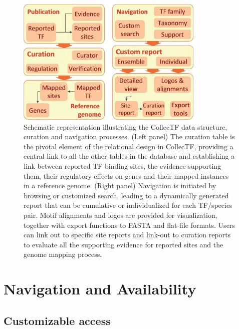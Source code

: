 \begin{figure}
  \centering
  \includegraphics[width=0.8\textwidth]{figures/chapter2/data-structure}
  \caption[Schematic representation illustrating the CollecTF data structure,
  curation and navigation processes.]{Schematic representation illustrating the
    CollecTF data structure, curation and navigation processes. (Left panel)
    The curation table is the pivotal element of the relational design in
    CollecTF, providing a central link to all the other tables in the database
    and establishing a link between reported TF-binding sites, the evidence
    supporting them, their regulatory effects on genes and their mapped
    instances in a reference genome. (Right panel) Navigation is initiated by
    browsing or customized search, leading to a dynamically generated report
    that can be cumulative or individualized for each TF/species pair. Motif
    alignments and logos are provided for visualization, together with export
    functions to FASTA and flat-file formats. Users can link out to specific
    site reports and link-out to curation reports to evaluate all the
    supporting evidence for reported sites and the genome mapping process.}
\label{fig:data-structure}
\end{figure}

\section{Navigation and Availability}

\subsection{Customizable access}

